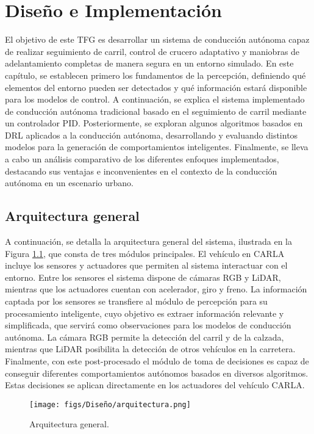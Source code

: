 \chapter{Diseño e Implementación}
\label{cap:capitulo4}

El objetivo de este \ac{TFG} es desarrollar un sistema de conducción autónoma capaz de realizar seguimiento de carril, control de crucero adaptativo y maniobras de adelantamiento completas de manera segura en un entorno simulado. En este capítulo, se establecen primero los fundamentos de la percepción, definiendo qué elementos del entorno pueden ser detectados y qué información estará disponible para los modelos de control. A continuación, se explica el sistema implementado de conducción autónoma tradicional basado en el seguimiento de carril mediante un controlador \ac{PID}. Posteriormente, se exploran algunos algoritmos basados en \ac{DRL} aplicados a la conducción autónoma, desarrollando y evaluando distintos modelos para la generación de comportamientos inteligentes. Finalmente, se lleva a cabo un análisis comparativo de los diferentes enfoques implementados, destacando sus ventajas e inconvenientes en el contexto de la conducción autónoma en un escenario urbano.

\section{Arquitectura general}

A continuación, se detalla la arquitectura general del sistema, ilustrada en la Figura \ref{fig:arch}, que consta de tres módulos principales. El vehículo en CARLA incluye los sensores y actuadores que permiten al sistema interactuar con el entorno. Entre los sensores el sistema dispone de cámaras RGB y \ac{LiDAR}, mientras que los actuadores cuentan con acelerador, giro y freno. La información captada por los sensores se transfiere al módulo de percepción para su procesamiento inteligente, cuyo objetivo es extraer información relevante y simplificada, que servirá como observaciones para los modelos de conducción autónoma. La cámara RGB permite la detección del carril y de la calzada, mientras que \ac{LiDAR} posibilita la detección de otros vehículos en la carretera. Finalmente, con este post-procesado el módulo de toma de decisiones es capaz de conseguir diferentes comportamientos autónomos basados en diversos algoritmos. Estas decisiones se aplican directamente en los actuadores del vehículo CARLA.

\begin{figure}[ht]
  \centering
  \texttt{[image: figs/Diseño/arquitectura.png]}
  \caption{Arquitectura general.}
  \label{fig:arch}
\end{figure}

